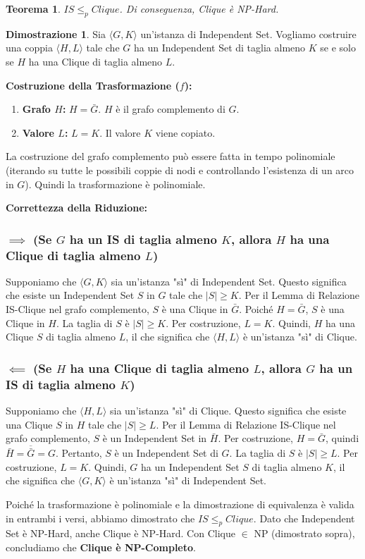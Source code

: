 \documentclass[a4paper, 11pt]{book} %
\newtheorem{theorem}{Teorema}[section]
\theoremstyle{definition}
\newtheorem*{proof*}{Dimostrazione}
\begin{document}
\begin{theorem}
$IS \le_p Clique$. Di conseguenza, \emph{Clique} è NP-Hard.
\end{theorem}

\begin{proof*}
Sia $\langle G, K \rangle$ un'istanza di Independent Set. Vogliamo costruire una coppia $\langle H, L \rangle$ tale che $G$ ha un Independent Set di taglia almeno $K$ se e solo se $H$ ha una Clique di taglia almeno $L$.

\textbf{Costruzione della Trasformazione ($f$):}
\begin{enumerate}
    \item \textbf{Grafo $H$:} $H = \bar{G}$. $H$ è il grafo complemento di $G$.
    \item \textbf{Valore $L$:} $L = K$. Il valore $K$ viene copiato.
\end{enumerate}
La costruzione del grafo complemento può essere fatta in tempo polinomiale (iterando su tutte le possibili coppie di nodi e controllando l'esistenza di un arco in $G$). Quindi la trasformazione è polinomiale.

\textbf{Correttezza della Riduzione:}

\subsubsection{$\implies$ (Se $G$ ha un IS di taglia almeno $K$, allora $H$ ha una Clique di taglia almeno $L$)}
Supponiamo che $\langle G, K \rangle$ sia un'istanza "sì" di Independent Set. Questo significa che esiste un Independent Set $S$ in $G$ tale che $|S| \ge K$.
Per il Lemma di Relazione IS-Clique nel grafo complemento, $S$ è una Clique in $\bar{G}$.
Poiché $H=\bar{G}$, $S$ è una Clique in $H$.
La taglia di $S$ è $|S| \ge K$. Per costruzione, $L=K$.
Quindi, $H$ ha una Clique $S$ di taglia almeno $L$, il che significa che $\langle H, L \rangle$ è un'istanza "sì" di Clique.

\subsubsection{$\impliedby$ (Se $H$ ha una Clique di taglia almeno $L$, allora $G$ ha un IS di taglia almeno $K$)}
Supponiamo che $\langle H, L \rangle$ sia un'istanza "sì" di Clique. Questo significa che esiste una Clique $S$ in $H$ tale che $|S| \ge L$.
Per il Lemma di Relazione IS-Clique nel grafo complemento, $S$ è un Independent Set in $\bar{H}$.
Per costruzione, $H=\bar{G}$, quindi $\bar{H} = \overline{\bar{G}} = G$.
Pertanto, $S$ è un Independent Set di $G$.
La taglia di $S$ è $|S| \ge L$. Per costruzione, $L=K$.
Quindi, $G$ ha un Independent Set $S$ di taglia almeno $K$, il che significa che $\langle G, K \rangle$ è un'istanza "sì" di Independent Set.

Poiché la trasformazione è polinomiale e la dimostrazione di equivalenza è valida in entrambi i versi, abbiamo dimostrato che $IS \le_p Clique$. Dato che Independent Set è NP-Hard, anche Clique è NP-Hard. Con Clique $\in$ NP (dimostrato sopra), concludiamo che \textbf{Clique è NP-Completo}.
\end{proof*}
\end{document}
